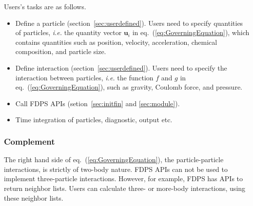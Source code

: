 Users's tasks are as follows.
\begin{itemize}

\item Define a particle (section~\ref{sec:userdefined}). Users
  need to specify quantities of particles, \textit{i.e.} the quantity vector
  $\bm{u}_i$ in eq.~(\ref{eq:GoverningEquation}), which contains quantities
  such as position, velocity, acceleration, chemical composition, and particle size.

\item Define interaction (section~\ref{sec:userdefined}). Users
  need to specify the interaction between particles, \textit{i.e.} the function
  $f$ and $g$ in eq.~(\ref{eq:GoverningEquation}), such as gravity,
  Coulomb force, and pressure.

\item Call FDPS APIs (setion~\ref{sec:initfin} and \ref{sec:module}).

\item Time integration of particles, diagnostic, output etc.

\end{itemize}

\subsubsection{Complement}

The right hand side of eq.~(\ref{eq:GoverningEquation}), the
particle-particle interactions, is strictly of two-body nature. FDPS
APIs can not be used to implement three-particle
interactions. However, for example, FDPS has APIs to return neighbor
lists. Users can calculate three- or more-body interactions, using
these neighbor lists.

